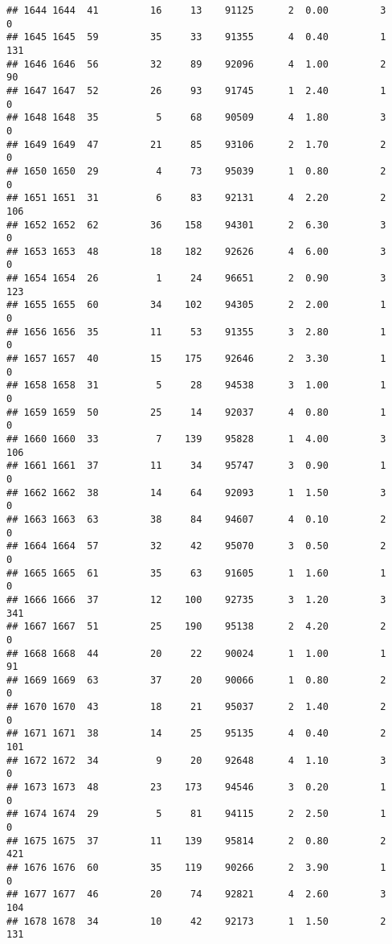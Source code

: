 \documentclass[
]{article}
\begin{document}
\begin{verbatim}
## 1644 1644  41         16     13    91125      2  0.00         3        0
## 1645 1645  59         35     33    91355      4  0.40         1      131
## 1646 1646  56         32     89    92096      4  1.00         2       90
## 1647 1647  52         26     93    91745      1  2.40         1        0
## 1648 1648  35          5     68    90509      4  1.80         3        0
## 1649 1649  47         21     85    93106      2  1.70         2        0
## 1650 1650  29          4     73    95039      1  0.80         2        0
## 1651 1651  31          6     83    92131      4  2.20         2      106
## 1652 1652  62         36    158    94301      2  6.30         3        0
## 1653 1653  48         18    182    92626      4  6.00         3        0
## 1654 1654  26          1     24    96651      2  0.90         3      123
## 1655 1655  60         34    102    94305      2  2.00         1        0
## 1656 1656  35         11     53    91355      3  2.80         1        0
## 1657 1657  40         15    175    92646      2  3.30         1        0
## 1658 1658  31          5     28    94538      3  1.00         1        0
## 1659 1659  50         25     14    92037      4  0.80         1        0
## 1660 1660  33          7    139    95828      1  4.00         3      106
## 1661 1661  37         11     34    95747      3  0.90         1        0
## 1662 1662  38         14     64    92093      1  1.50         3        0
## 1663 1663  63         38     84    94607      4  0.10         2        0
## 1664 1664  57         32     42    95070      3  0.50         2        0
## 1665 1665  61         35     63    91605      1  1.60         1        0
## 1666 1666  37         12    100    92735      3  1.20         3      341
## 1667 1667  51         25    190    95138      2  4.20         2        0
## 1668 1668  44         20     22    90024      1  1.00         1       91
## 1669 1669  63         37     20    90066      1  0.80         2        0
## 1670 1670  43         18     21    95037      2  1.40         2        0
## 1671 1671  38         14     25    95135      4  0.40         2      101
## 1672 1672  34          9     20    92648      4  1.10         3        0
## 1673 1673  48         23    173    94546      3  0.20         1        0
## 1674 1674  29          5     81    94115      2  2.50         1        0
## 1675 1675  37         11    139    95814      2  0.80         2      421
## 1676 1676  60         35    119    90266      2  3.90         1        0
## 1677 1677  46         20     74    92821      4  2.60         3      104
## 1678 1678  34         10     42    92173      1  1.50         2      131

\end{verbatim}
\end{document}
